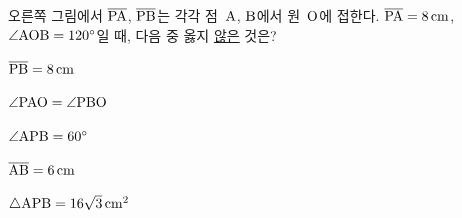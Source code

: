 \noindent\begin{minipage}[t]{0.58\linewidth}\vspace{0pt}\raggedright 오른쪽 그림에서 $\overline{\mathrm{PA}}$, $\overline{\mathrm{PB}}$는 각각 점~$\mathrm{A}$, $\mathrm{B}$에서 원~$\mathrm{O}$에 접한다. $\overline{\mathrm{PA}}=8\,\mathrm{cm}$, $\angle\mathrm{AOB}=120^\circ$일 때, 다음 중 옳지 \underline{않은} 것은?\end{minipage}\hfill\begin{minipage}[t]{0.4\linewidth}\vspace{0pt}\centering \resizebox{\ifdim\width>\linewidth\linewidth\else\width\fi}{!}{}\end{minipage}\par
\begin{choicesv}{\rule[-3ex]{0pt}{8ex}$\overline{\mathrm{PB}}=8\,\mathrm{cm}$}{\rule[-3ex]{0pt}{8ex}$\angle\mathrm{PAO}=\angle\mathrm{PBO}$}{\rule[-3ex]{0pt}{8ex}$\angle\mathrm{APB}=60^\circ$}{\rule[-3ex]{0pt}{8ex}$\overline{\mathrm{AB}}=6\,\mathrm{cm}$}{\rule[-3ex]{0pt}{8ex}$\triangle\mathrm{APB}=16\sqrt{3}\,\mathrm{cm}^2$}\end{choicesv}
